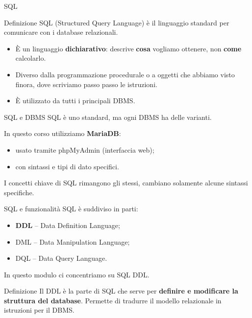 \documentclass{beamer}
\begin{document}
\begin{frame}{SQL}
\begin{block}{Definizione}
SQL (Structured Query Language) è il linguaggio standard per comunicare con i database relazionali.
\end{block}

\begin{itemize}
    \item È un linguaggio \textbf{dichiarativo}: descrive \textbf{cosa} vogliamo ottenere, non \textbf{come} calcolarlo.
    \item Diverso dalla programmazione procedurale o a oggetti che abbiamo visto finora, dove scriviamo passo passo le istruzioni.
    \item È utilizzato da tutti i principali DBMS.
\end{itemize}
\end{frame}

\begin{frame}{SQL e DBMS}
SQL è uno standard, ma ogni DBMS ha delle varianti.

\medskip
In questo corso utilizziamo \textbf{MariaDB}:

\begin{itemize}
    \item usato tramite phpMyAdmin (interfaccia web);
    \item con sintassi e tipi di dato specifici.
\end{itemize}

I concetti chiave di SQL rimangono gli stessi, cambiano solamente alcune sintassi specifiche.
\end{frame}

\begin{frame}{SQL e funzionalità}
SQL è suddiviso in parti:
\begin{itemize}
    \item \textbf{DDL} -- Data Definition Language;
    \item DML -- Data Manipulation Language;
    \item DQL -- Data Query Language.
\end{itemize}

\medskip
In questo modulo ci concentriamo su SQL DDL.

\begin{block}{Definizione}
Il DDL è la parte di SQL che serve per \textbf{definire e modificare la struttura del database}. Permette di tradurre il modello relazionale in istruzioni per il DBMS.
\end{block}

\end{frame}
\end{document}
